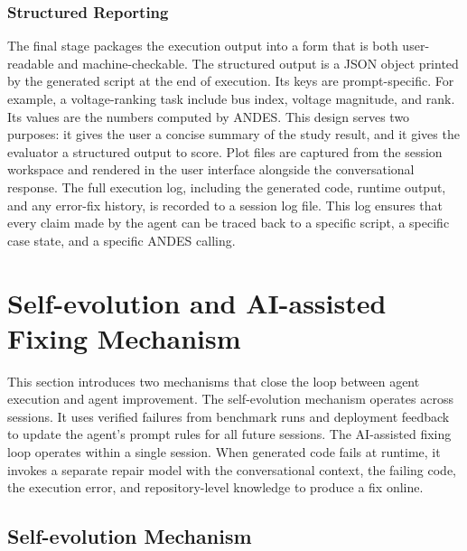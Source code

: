 \documentclass[journal]{IEEEtran}
\begin{document}
\subsubsection{Structured Reporting}

The final stage packages the execution output into a form that is both user-readable and machine-checkable.
The structured output is a JSON object printed by the generated script at the end of execution.
Its keys are prompt-specific. For example, a voltage-ranking task include bus index, voltage magnitude, and rank.
Its values are the numbers computed by ANDES.
This design serves two purposes: it gives the user a concise summary of the study result, and it gives the evaluator a structured output to score.
Plot files are captured from the session workspace and rendered in the user interface alongside the conversational response.
The full execution log, including the generated code, runtime output,
and any error-fix history, is recorded to a session log file.
This log ensures that every claim made by the agent can be traced back
to a specific script, a specific case state, and a specific ANDES
calling.



\section{Self-evolution and AI-assisted Fixing Mechanism}
\label{sec:pfagent}

This section introduces two mechanisms that close the loop between agent execution and agent improvement.
The self-evolution mechanism operates across sessions. It uses verified failures from benchmark runs and deployment feedback to update the agent's prompt rules for all future sessions.
The AI-assisted fixing loop operates within a single session.
When generated code fails at runtime, it invokes a separate repair model with the conversational context, the failing code, the execution error, and repository-level knowledge to produce a fix online.

\subsection{Self-evolution Mechanism}
\label{subsec:selfevo}
\end{document}
